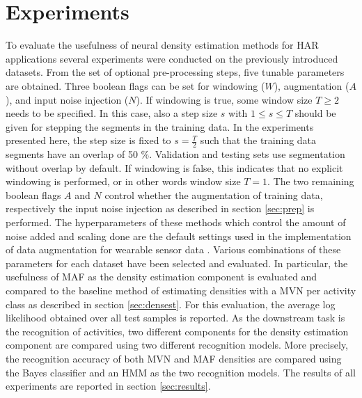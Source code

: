\documentclass[11pt,titlepage,oneside,openany]{book}
\begin{document}
\section{Experiments}
\label{sec:exp}
To evaluate the usefulness of neural density estimation methods for HAR applications several experiments were conducted on the previously introduced datasets. From the set of optional pre-processing steps, five tunable parameters are obtained. Three boolean flags can be set for windowing ($W$), augmentation ($A$), and input noise injection ($N$). If windowing is true, some window size $T \geq 2$ needs to be specified. In this case, also a step size $s$ with $1 \leq s \leq T$ should be given for stepping the segments in the training data. In the experiments presented here, the step size is fixed to $s = \frac{T}{2}$ such that the training data segments have an overlap of 50 \%. Validation and testing sets use segmentation without overlap by default. If windowing is false, this indicates that no explicit windowing is performed, or in other words window size $T = 1$. The two remaining boolean flags $A$ and $N$ control whether the augmentation of training data, respectively the input noise injection as described in section \ref{sec:prep} is performed. The hyperparameters of these methods which control the amount of noise added and scaling done are the default settings used in the implementation of data augmentation for wearable sensor data \cite{um_augmentation_2017}. Various combinations of these parameters for each dataset have been selected and evaluated. In particular, the usefulness of MAF as the density estimation component is evaluated and compared to the baseline method of estimating densities with a MVN per activity class as described in section \ref{sec:densest}. For this evaluation, the average log likelihood obtained over all test samples is reported. As the downstream task is the recognition of activities, two different components for the density estimation component are compared using two different recognition models. More precisely, the recognition accuracy of both MVN and MAF densities are compared using the Bayes classifier and an HMM as the two recognition models. The results of all experiments are reported in section \ref{sec:results}.
\end{document}
